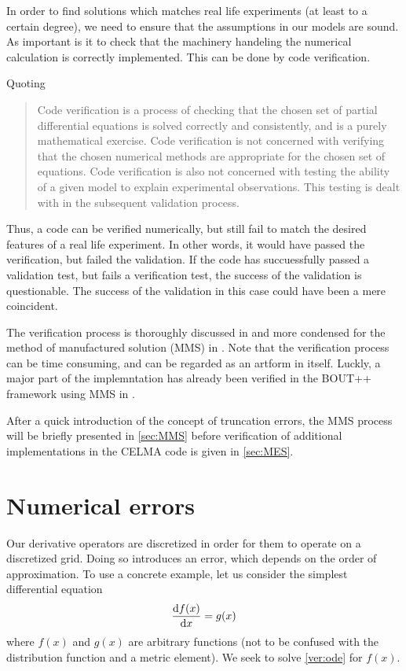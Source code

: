 In order to find solutions which matches real life experiments (at least to a certain degree), we need to ensure that the assumptions in our models are sound.
As important is it to check that the machinery handeling the numerical calculation is correctly implemented.
This can be done by code verification.

Quoting \cite{Dudson2016}

\blockquote{
Code verification is a process of checking that the chosen set of partial differential equations is solved correctly and consistently, and is a purely mathematical exercise.
Code verification is not concerned with verifying that the chosen numerical methods are appropriate for the chosen set of equations.
Code verification is also not concerned with testing the ability of a given model to explain experimental observations.
This testing is dealt with in the subsequent validation process.
}

Thus, a code can be verified numerically, but still fail to match the desired features of a real life experiment.
In other words, it would have passed the verification, but failed the validation.
If the code has succuessfully passed a validation test, but fails a verification test, the success of the validation is questionable.
The success of the validation in this case could have been a mere coincident.

The verification process is thoroughly discussed in \cite{Oberkampf2010book} and more condensed for the method of manufactured solution (MMS) in \cite{Salari}.
Note that the verification process can be time consuming, and can be regarded as an artform in itself.
Luckly, a major part of the implemntation has already been verified in the BOUT++ framework using MMS in \cite{Dudson2016}.

After a quick introduction of the concept of truncation errors, the MMS process will be briefly presented in \cref{sec:MMS} before verification of additional implementations in the CELMA code is given in \cref{sec:MES}.

\section{Numerical errors}
%
Our derivative operators are discretized in order for them to operate on a discretized grid.
Doing so introduces an error, which depends on the order of approximation.
To use a concrete example, let us consider the simplest differential equation
%
\begin{align}
    \frac{\text{d}{f(x)}}{\text{d}{x}} = g(x)
    \label{ver:ode}
\end{align}
%
where $f(x)$ and $g(x)$ are arbitrary functions (not to be confused with the distribution function and a metric element).
We seek to solve \cref{ver:ode} for $f(x)$.

